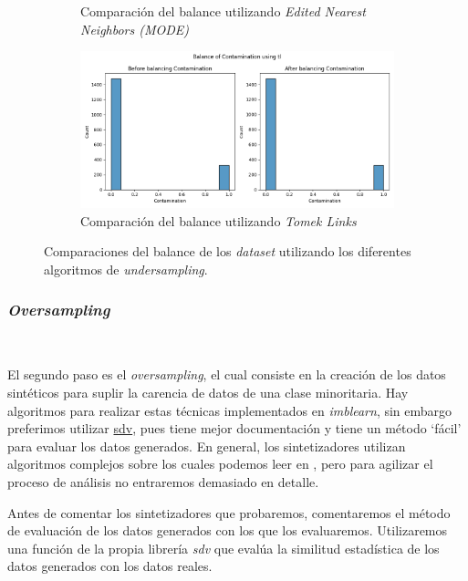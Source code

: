 \begin{figure}[!ht]
\begin{subfigure}[b]{0.5\textwidth}
        \caption{Comparación del balance utilizando \textit{Edited Nearest Neighbors (MODE)}}
    \end{subfigure}
    \begin{subfigure}[b]{0.5\textwidth}
        \centering
        \includegraphics[width=\textwidth]{media/images/under-sampling/tl.png}
        \caption{Comparación del balance utilizando \textit{Tomek Links}}
    \end{subfigure}
    \caption{Comparaciones del balance de los \textit{dataset} utilizando los diferentes algoritmos de \textit{undersampling}.}\label{fig:undersampling-methods-balance}
\end{figure}
\clearpage

\subsubsection{\textit{Oversampling}}\ \label{sec:oversampling}

El segundo paso es el \textit{oversampling}, el cual consiste en la creación de los datos sintéticos para suplir la carencia de datos de una clase minoritaria. Hay algoritmos para realizar estas técnicas implementados en \textit{imblearn}, sin embargo preferimos utilizar \href{https://sdv.dev/}{sdv}, pues tiene mejor documentación y tiene un método `fácil' para evaluar los datos generados. \cite{Synthesi69:online} En general, los sintetizadores utilizan algoritmos complejos sobre los cuales podemos leer en \cite{Synthesi69:online}, pero para agilizar el proceso de análisis no entraremos demasiado en detalle.

Antes de comentar los sintetizadores que probaremos, comentaremos el método de evaluación de los datos generados con los que los evaluaremos. Utilizaremos una función de la propia librería \textit{sdv} que evalúa la similitud estadística de los datos generados con los datos reales.

